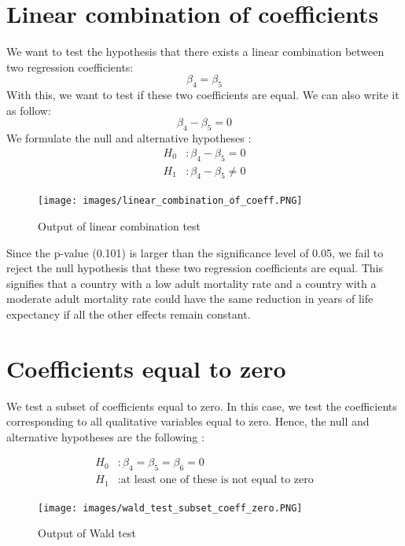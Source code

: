 \section{Linear combination  of coefficients}

 We want to test the hypothesis that there exists a linear combination between two regression coefficients: \begin{equation*}
     \beta_4 = \beta_5
 \end{equation*} 
 With this, we want to test if these two coefficients are equal. We can also write it as follow: \begin{equation*}
     \beta_4 - \beta_5 = 0
 \end{equation*}
We formulate the null and alternative hypotheses : 
\begin{align*}
	H_0&: \beta_4 - \beta_5 = 0 \\
	H_1&: \beta_4 - \beta_5 \neq 0
\end{align*}

\begin{figure}[H]
	\centering
	\texttt{[image: images/linear\_combination\_of\_coeff.PNG]}
	\caption{Output of linear combination test}
\end{figure}

Since the p-value (0.101) is larger than the significance level of 0.05, we fail to reject the null hypothesis that these two regression coefficients are equal. This signifies that a country with a low adult mortality rate and a country with a moderate adult mortality rate could have the same reduction in years of life expectancy if all the other effects remain constant. 

\section{Coefficients equal to zero}

We test a subset of coefficients equal to zero. In this case, we test the coefficients corresponding to all qualitative variables equal to zero. Hence, the null and alternative hypotheses are the following :

\begin{align*}
	H_0&: \beta_4 = \beta_5 = \beta_6 = 0 \\
	H_1&: \text{at least one of these is not equal to zero}
\end{align*}

\begin{figure}[H]
	\centering
	\texttt{[image: images/wald\_test\_subset\_coeff\_zero.PNG]}
	\caption{Output of Wald test}
\end{figure}

